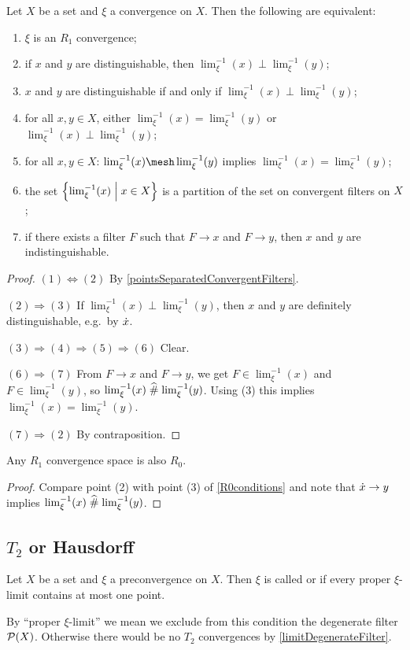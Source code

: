 \begin{proposition} \label{R1Conditions}
Let $X$ be a set and $\xi$ a convergence on $X$. Then the following are equivalent:
\begin{enumerate}
\item $\xi$ is an $R_1$ convergence;
\item if $x$ and $y$ are distinguishable, then $\lim_\xi^{-1}(x)\perp \lim_\xi^{-1}(y)$;
\item $x$ and $y$ are distinguishable \textup{if and only if} $\lim_\xi^{-1}(x)\perp \lim_\xi^{-1}(y)$;
\item for all $x,y\in X$, either $\lim_\xi^{-1}(x) = \lim_\xi^{-1}(y)$ or $\lim_\xi^{-1}(x)\perp \lim_\xi^{-1}(y)$;
\item for all $x,y\in X$: $\lim_\xi^{-1}(x)\mesh \lim_\xi^{-1}(y)$ implies $\lim_\xi^{-1}(x) = \lim_\xi^{-1}(y)$;
\item the set $\setbuilder{\lim^{-1}_\xi(x)}{x\in X}$ is a partition of the set on convergent filters on $X$;
\item if there exists a filter $F$ such that $F \to x$ and $F \to y$, then $x$ and $y$ are indistinguishable.
\end{enumerate}
\end{proposition}
\begin{proof}
$(1) \Leftrightarrow (2)$ By \ref{pointsSeparatedConvergentFilters}.

$(2) \Rightarrow (3)$ If $\lim_\xi^{-1}(x)\perp \lim_\xi^{-1}(y)$, then $x$ and $y$ are definitely distinguishable, e.g.\ by $\dot{x}$.

$(3) \Rightarrow (4) \Rightarrow (5) \Rightarrow (6)$ Clear.

$(6) \Rightarrow (7)$ From $F\to x$ and $F\to y$, we get $F\in \lim_\xi^{-1}(x)$ and $F\in \lim_\xi^{-1}(y)$, so $\lim_\xi^{-1}(x)\mathrel{\widehat{\#}} \lim_\xi^{-1}(y)$. Using (3) this implies $\lim_\xi^{-1}(x) = \lim_\xi^{-1}(y)$.

$(7) \Rightarrow (2)$ By contraposition.
\end{proof}
\begin{corollary}
Any $R_1$ convergence space is also $R_0$.
\end{corollary}
\begin{proof}
Compare point (2) with point (3) of \ref{R0conditions} and note that $\dot{x}\to y$ implies $\lim_\xi^{-1}(x)\mathrel{\widehat{\#}} \lim_\xi^{-1}(y)$. 
\end{proof}


\subsection{$T_2$ or Hausdorff}
\begin{definition}
Let $X$ be a set and $\xi$ a preconvergence on $X$. Then $\xi$ is called  or  if every proper $\xi$-limit contains at most one point.
\end{definition}
By ``proper $\xi$-limit'' we mean we exclude from this condition the degenerate filter $\operatorname{\mathcal{P}}(X)$. Otherwise there would be no $T_2$ convergences by \ref{limitDegenerateFilter}.


